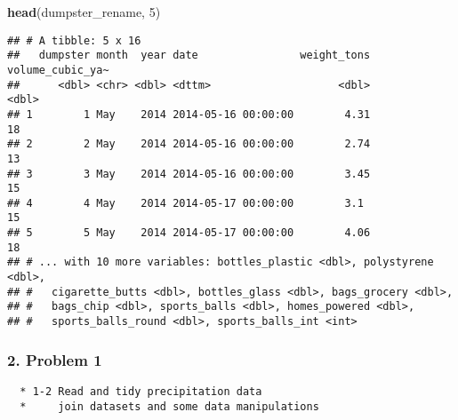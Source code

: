 \documentclass[]{article}
\newenvironment{Shaded}{\begin{snugshade}}{\end{snugshade}}
\newcommand{\DecValTok}[1]{\textcolor[rgb]{0.00,0.00,0.81}{#1}}
\newcommand{\KeywordTok}[1]{\textcolor[rgb]{0.13,0.29,0.53}{\textbf{#1}}}
\newcommand{\NormalTok}[1]{#1}
\begin{document}
\begin{Shaded}
\begin{Highlighting}[]
\KeywordTok{head}\NormalTok{(dumpster_rename, }\DecValTok{5}\NormalTok{)}
\end{Highlighting}
\end{Shaded}

\begin{verbatim}
## # A tibble: 5 x 16
##   dumpster month  year date                weight_tons volume_cubic_ya~
##      <dbl> <chr> <dbl> <dttm>                    <dbl>            <dbl>
## 1        1 May    2014 2014-05-16 00:00:00        4.31               18
## 2        2 May    2014 2014-05-16 00:00:00        2.74               13
## 3        3 May    2014 2014-05-16 00:00:00        3.45               15
## 4        4 May    2014 2014-05-17 00:00:00        3.1                15
## 5        5 May    2014 2014-05-17 00:00:00        4.06               18
## # ... with 10 more variables: bottles_plastic <dbl>, polystyrene <dbl>,
## #   cigarette_butts <dbl>, bottles_glass <dbl>, bags_grocery <dbl>,
## #   bags_chip <dbl>, sports_balls <dbl>, homes_powered <dbl>,
## #   sports_balls_round <dbl>, sports_balls_int <int>
\end{verbatim}

\hypertarget{problem-1-1}{%
\subsubsection{2. Problem 1}\label{problem-1-1}}

\begin{verbatim}
  * 1-2 Read and tidy precipitation data
  *     join datasets and some data manipulations
\end{verbatim}
\end{document}
